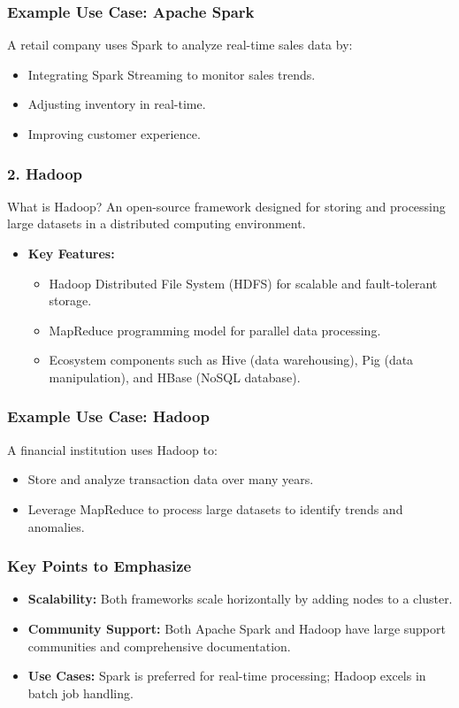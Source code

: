 \documentclass[aspectratio=169]{beamer}
\begin{document}
\begin{frame}[fragile]
    \frametitle{Example Use Case: Apache Spark}
    A retail company uses Spark to analyze real-time sales data by:
    \begin{itemize}
        \item Integrating Spark Streaming to monitor sales trends.
        \item Adjusting inventory in real-time.
        \item Improving customer experience.
    \end{itemize}
\end{frame}

\begin{frame}[fragile]
    \frametitle{2. Hadoop}
    \begin{block}{What is Hadoop?}
        An open-source framework designed for storing and processing large datasets in a distributed computing environment.
    \end{block}
    \begin{itemize}
        \item \textbf{Key Features:}
        \begin{itemize}
            \item Hadoop Distributed File System (HDFS) for scalable and fault-tolerant storage.
            \item MapReduce programming model for parallel data processing.
            \item Ecosystem components such as Hive (data warehousing), Pig (data manipulation), and HBase (NoSQL database).
        \end{itemize}
    \end{itemize}
\end{frame}

\begin{frame}[fragile]
    \frametitle{Example Use Case: Hadoop}
    A financial institution uses Hadoop to:
    \begin{itemize}
        \item Store and analyze transaction data over many years.
        \item Leverage MapReduce to process large datasets to identify trends and anomalies.
    \end{itemize}
\end{frame}

\begin{frame}[fragile]
    \frametitle{Key Points to Emphasize}
    \begin{itemize}
        \item \textbf{Scalability:} Both frameworks scale horizontally by adding nodes to a cluster.
        \item \textbf{Community Support:} Both Apache Spark and Hadoop have large support communities and comprehensive documentation.
        \item \textbf{Use Cases:} Spark is preferred for real-time processing; Hadoop excels in batch job handling.
    \end{itemize}
\end{frame}
\end{document}
